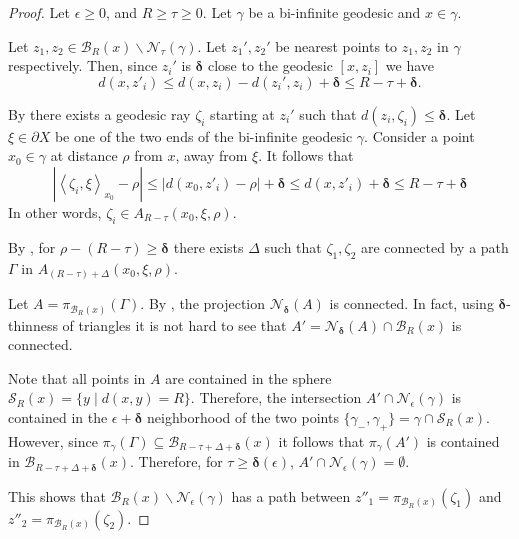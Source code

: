 \documentclass{amsart}
\numberwithin{equation}{section}
\theoremstyle{definition}
\newcommand{\calB}{\mathcal{B}}
\newcommand{\calN}{\mathcal{N}}
\newcommand{\calS}{\mathcal{S}}
\newcommand{\gen}[1]{\left< #1 \right>}
\newcommand{\bdelta}{{\boldsymbol\delta}}
\newcommand{\ssm}{\smallsetminus}
\begin{document}
\begin{proof}
Let $\epsilon \ge 0$, and $R\ge \tau\ge 0$. Let $\gamma$ be a bi-infinite geodesic and  $x\in \gamma$. 

Let $z_1,z_2\in \calB_R(x)\ssm \calN_\tau(\gamma)$. 
Let $z_1',z_2'$ be nearest points to $z_1,z_2$ in $\gamma$ respectively.
Then, since $z_i'$ is $\bdelta$ close to the geodesic $[x,z_i]$ we have 
\begin{equation}\label{eq: distance x and projection of z} 
d(x,z'_i) \le  d(x,z_i)-d(z_i',z_i)+\bdelta\le R-\tau+\bdelta.
\end{equation}

By \cite[Lemma 3.1]{bestvina1991boundary} there exists a geodesic ray $\zeta_i$ starting at $z_i'$ such that $d(z_i,\zeta_i)\le \bdelta$.
Let $\xi\in \partial X$ be one of the two ends of the bi-infinite geodesic $\gamma$.
Consider a point $x_0\in \gamma$ at distance $\rho$ from $x$, away from $\xi$.
It follows that $$ |\gen{\zeta_i,\xi}_{x_0} - \rho|\le |d(x_0,z'_i) - \rho|+\bdelta\le d(x,z'_i)+\bdelta\le R-\tau+\bdelta$$
In other words, $\zeta_i \in A_{R-\tau}(x_0,\xi,\rho).$

By , for $\rho -(R-\tau) \ge \bdelta$ there exists $\Delta$ such that $\zeta_1,\zeta_2$ are connected by a path $\Gamma$ in $A_{(R-\tau)+\Delta}(x_0,\xi,\rho).$

Let $A = \pi_{\calB_R(x)}(\Gamma)$. 
By , the projection $\calN_\bdelta(A)$ is connected.
In fact, using $\bdelta$-thinness of triangles it is not hard to see that $A'=\calN_{\bdelta}(A)\cap \calB_R(x)$ is connected. 


Note that all points in $A$ are contained in the sphere $\calS_R(x) = \{y\;|\;d(x,y)=R\}$.
Therefore, the intersection $A'\cap \calN_\epsilon(\gamma)$ is contained in the $\epsilon+\bdelta$ neighborhood of the two points $\{\gamma_-,\gamma_+\}=\gamma \cap \calS_R(x).$
However, since $\pi_\gamma(\Gamma) \subseteq \calB_{R-\tau+\Delta+\bdelta}(x)$ it follows that $\pi_\gamma(A')$ is contained in $\calB_{R-\tau+\Delta+\bdelta}(x)$.
Therefore, for $\tau\ge \bdelta(\epsilon)$, $A'\cap \calN_\epsilon(\gamma)=\emptyset$.

This shows that $\calB_R(x)\ssm \calN_\epsilon (\gamma)$ has a path between $z''_1= \pi_{\calB_R(x)}(\zeta_1)$ and $z''_2=\pi_{\calB_R(x)}(\zeta_2)$.


\end{proof}
\end{document}
